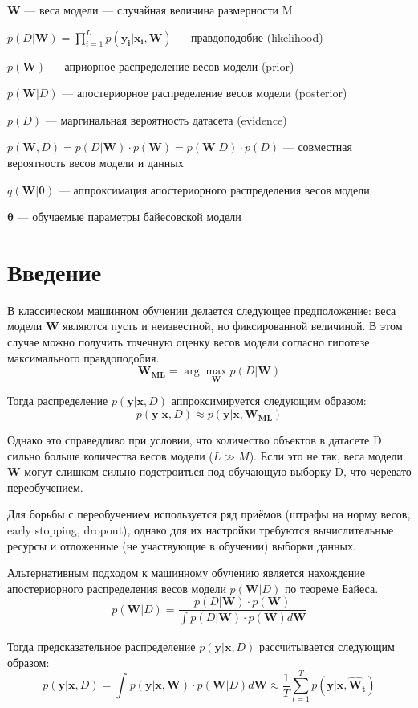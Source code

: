 \documentclass{article}
\newcommand{\argmax}{\arg\!\max}
\begin{document}
$\pmb{W}$ --- веса модели --- случайная величина размерности M

$p(D | \pmb{W}) = \prod_{i=1}^{L} p(\pmb{y_i} | \pmb{x_i}, \pmb{W})$ — правдоподобие (likelihood)

$p(\pmb{W})$ --- априорное распределение весов модели (prior)

$p(\pmb{W}| D)$ --- апостериорное распределение весов модели (posterior)

$p(D)$ --- маргинальная вероятность датасета (evidence)

$
p(\pmb{W}, D) =
p(D | \pmb{W}) \cdot p(\pmb{W}) =
p(\pmb{W}| D)\cdot p(D)
$ --- совместная вероятность весов модели и данных

$q(\pmb{W} | \pmb{\theta})$ --- аппроксимация апостериорного распределения весов модели

$\pmb{\theta}$ --- обучаемые параметры байесовской модели

\section{Введение}

В классическом машинном обучении делается следующее предположение: веса модели $\pmb{W}$ являются пусть и неизвестной, но фиксированной величиной. В этом случае можно получить точечную оценку весов модели согласно гипотезе максимального правдоподобия.
\[
 \pmb{W_{ML}} = \argmax_{\pmb{W}} p(D | \pmb{W})
\]

Тогда распределение $p(\pmb{y} | \pmb{x}, D)$ аппроксимируется следующим образом:
\[
 p(\pmb{y} | \pmb{x}, D) \approx p(\pmb{y} | \pmb{x}, \pmb{W_{ML}})
\]

Однако это справедливо при условии, что количество объектов в датасете D сильно больше количества весов модели ($L \gg M$). Если это не так, веса модели $\pmb{W}$ могут слишком сильно подстроиться под обучающую выборку D, что черевато переобучением.

Для борьбы с переобучением используется ряд приёмов (штрафы на норму весов, early stopping, dropout), однако для их настройки требуются вычислительные ресурсы и отложенные (не участвующие в обучении) выборки данных.

Альтернативным подходом к машинному обучению является нахождение апостериорного распределения весов модели $p(\pmb{W}| D)$ по теореме Байеса.
\[
 p(\pmb{W}| D) =
 \dfrac{p(D | \pmb{W}) \cdot p(\pmb{W})}{\int_{}{} p(D | \pmb{W}) \cdot p(\pmb{W}) d \pmb{W}}
\]

Тогда предсказательное распределение $p(\pmb{y} | \pmb{x}, D)$ рассчитывается следующим образом:
\[
 p(\pmb{y} | \pmb{x}, D) =
 \int_{}{} p(\pmb{y} | \pmb{x}, \pmb{W}) \cdot p(\pmb{W} | D) d \pmb{W}
 \approx \dfrac{1}{T} \sum_{t=1}^{T}{p(\pmb{y} | \pmb{x}, \pmb{\hat{W}_{t}})}
\]
\end{document}
